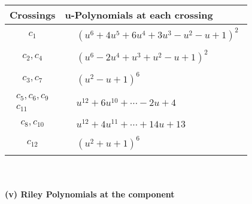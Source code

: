 \documentclass[1p]{elsarticle_modified}
\theoremstyle{definition}
\begin{document}
\begin{tabular}{m{50pt}|m{274pt}}
Crossings & \hspace{64pt}u-Polynomials at each crossing \\
\hline $$\begin{aligned}c_{1}\end{aligned}$$&$\begin{aligned}
&(u^6+4 u^5+6 u^4+3 u^3- u^2- u+1)^2
\end{aligned}$\\
\hline $$\begin{aligned}c_{2},c_{4}\end{aligned}$$&$\begin{aligned}
&(u^6-2 u^4+u^3+u^2- u+1)^2
\end{aligned}$\\
\hline $$\begin{aligned}c_{3},c_{7}\end{aligned}$$&$\begin{aligned}
&(u^2- u+1)^6
\end{aligned}$\\
\hline $$\begin{aligned}c_{5},c_{6},c_{9}\\c_{11}\end{aligned}$$&$\begin{aligned}
&u^{12}+6 u^{10}+\cdots-2 u+4
\end{aligned}$\\
\hline $$\begin{aligned}c_{8},c_{10}\end{aligned}$$&$\begin{aligned}
&u^{12}+4 u^{11}+\cdots+14 u+13
\end{aligned}$\\
\hline $$\begin{aligned}c_{12}\end{aligned}$$&$\begin{aligned}
&(u^2+u+1)^6
\end{aligned}$\\
\hline
\end{tabular}\\~\\
\newpage\renewcommand{\arraystretch}{1}
\flushleft \textbf{(v) Riley Polynomials at the component}\newline \\
\end{document}
